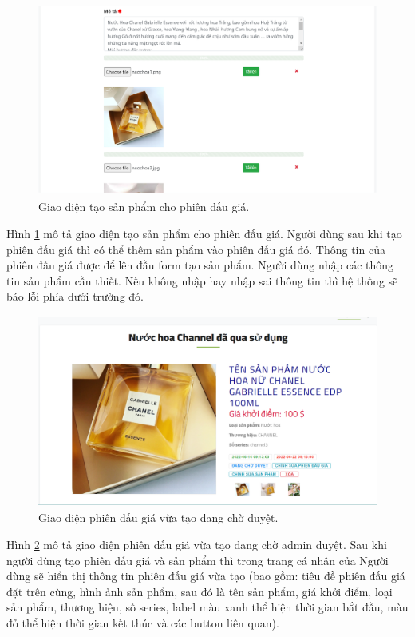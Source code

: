 \documentclass[../DoAn.tex]{subfiles}
\begin{document}
\begin{figure}[H]
    \centering
    \includegraphics[width=11.4cm,height=6.32cm]{Hinhve/createitem2demo.png}
    \caption{Giao diện tạo sản phẩm cho phiên đấu giá.}
    \label{fig:Fig415}
\end{figure}
Hình \ref{fig:Fig415} mô tả giao diện tạo sản phẩm cho phiên đấu giá. Người dùng sau khi tạo phiên đấu giá thì có thể thêm sản phẩm vào phiên đấu giá đó. Thông tin của phiên đấu giá được để lên đầu form tạo sản phẩm. Người dùng nhập các thông tin sản phẩm cần thiết. Nếu không nhập hay nhập sai thông tin thì hệ thống sẽ báo lỗi phía dưới trường đó.
\begin{figure}[H]
    \centering
    \includegraphics[width=11.4cm,height=6.32cm]{Hinhve/auctionwait.png}
    \caption{Giao diện phiên đấu giá vừa tạo đang chờ duyệt.}
    \label{fig:Fig416}
\end{figure}
Hình \ref{fig:Fig416} mô tả giao diện phiên đấu giá vừa tạo đang chờ admin duyệt. Sau khi người dùng tạo phiên đấu giá và sản phẩm thì trong trang cá nhân của Người dùng sẽ hiển thị thông tin phiên đấu giá vừa tạo (bao gồm: tiêu đề phiên đấu giá đặt trên cùng, hình ảnh sản phẩm, sau đó là tên sản phẩm, giá khởi điểm, loại sản phẩm, thương hiệu, số series, label màu xanh thể hiện thời gian bắt đầu, màu đỏ thể hiện thời gian kết thúc và các button liên quan).\\
\end{document}
